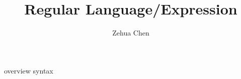 \documentclass{report}
\title{Regular Language/Expression}
\author{Zehua Chen}
\begin{document}
  \maketitle
  \tableofcontents

  \setmainstyles

  {overview}
  {syntax}
\end{document}
